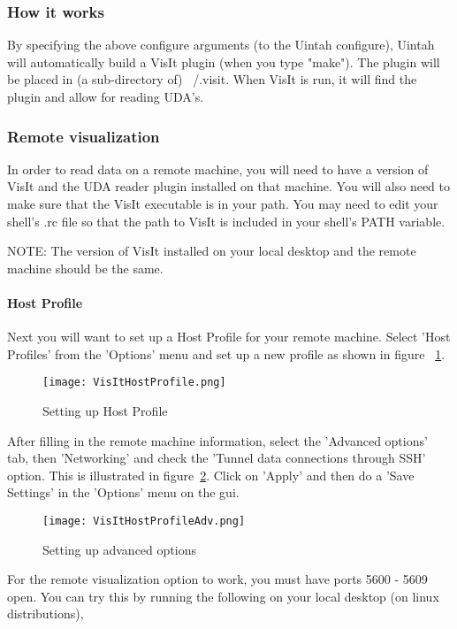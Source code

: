 \subsubsection{How it works}
By specifying the above configure arguments (to the Uintah configure), Uintah will automatically build a VisIt plugin (when you type "make"). The plugin will be placed in (a sub-directory of) ~/.visit. When VisIt is run, it will find the plugin and allow for reading UDA's.

\subsubsection{Remote visualization}
In order to read data on a remote machine, you will need to have a version of VisIt and the UDA reader plugin installed on that machine. You will also need to make sure that the VisIt executable is in your path. You may need to edit your shell's .rc file so that the path to VisIt is included in your shell's PATH variable.

NOTE: The version of VisIt installed on your local desktop and the remote machine should be the same.

\paragraph{Host Profile}
Next you will want to set up a Host Profile for your remote machine. Select 'Host Profiles' from the 'Options' menu and set up a new profile as shown in figure ~\ref{VisItHostProfile}.

\begin{figure}
  \center
  \texttt{[image: VisItHostProfile.png]}
  \caption{Setting up Host Profile}
  \label{VisItHostProfile}
\end{figure}

After filling in the remote machine information, select the 'Advanced options' tab, then 'Networking' and check the 'Tunnel data connections through SSH' option. This is illustrated in figure~\ref{VisItHostProfileAdv}. Click on 'Apply' and then do a 'Save Settings' in the 'Options' menu on the gui.

\begin{figure}
  \center
  \texttt{[image: VisItHostProfileAdv.png]}
  \caption{Setting up advanced options}
  \label{VisItHostProfileAdv}
\end{figure}

For the remote visualization option to work, you must have ports 5600 - 5609 open. You can try this by running the following on your local desktop (on linux distributions),

